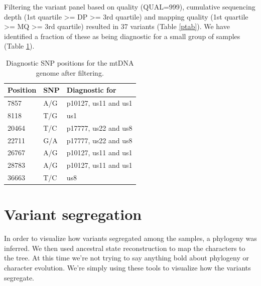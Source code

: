 \documentclass{article}\usepackage[]{graphicx}\usepackage[]{color}
\begin{document}

Filtering the variant panel based on quality (QUAL=999), cumulative sequencing depth (1st quartile >= DP >= 3rd quartile) and mapping quality (1st quartile >= MQ >= 3rd quartile) resulted in 37 variants (Table \ref{ptab}).  We have identified a fraction of these as being diagnostic for a small group of samples (Table \ref{table:DiagSNP}).


\begin{table}[h!]
\centering
\caption{Diagnostic SNP positions for the mtDNA genome after filtering.}
\begin{tabular}{@{}lll@{}}
\toprule
Position & SNP & Diagnostic for       \\ \midrule
7857     & A/G & p10127, us11 and us1 \\
8118     & T/G & us1                  \\
20464    & T/C & p17777, us22 and us8 \\
22711    & G/A & p17777, us22 and us8 \\
26767    & A/G & p10127, us11 and us1 \\
28783    & A/G & p10127, us11 and us1 \\
36663    & T/C & us8                  \\ \bottomrule
\end{tabular}
\label{table:DiagSNP}
\end{table}


\section{Variant segregation}

In order to visualize how variants segregated among the samples, a phylogeny was inferred.  We then used ancestral state reconstruction to map the characters to the tree.  At this time we're not trying to say anything bold about phylogeny or character evolution.  We're simply using these tools to visualize how the variants segregate.
\end{document}
